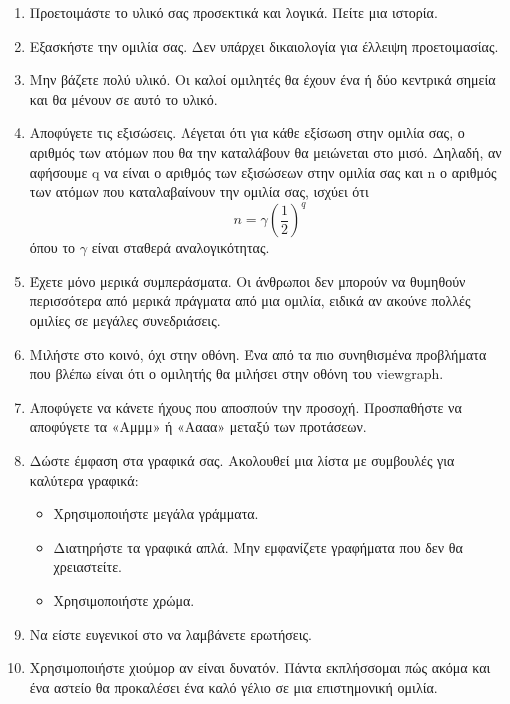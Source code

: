 \documentclass[12pt]{article}
\begin{document}
\begin{enumerate}

\item Προετοιμάστε το υλικό σας προσεκτικά και λογικά. Πείτε μια ιστορία.

\item Εξασκήστε την ομιλία σας. Δεν υπάρχει δικαιολογία για έλλειψη προετοιμασίας.

\item Μην βάζετε πολύ υλικό. Οι καλοί ομιλητές θα έχουν ένα ή δύο κεντρικά σημεία και θα μένουν σε αυτό το υλικό.

\item Αποφύγετε τις εξισώσεις. Λέγεται ότι για κάθε εξίσωση στην ομιλία σας, ο αριθμός των ατόμων που θα την καταλάβουν θα μειώνεται στο μισό. Δηλαδή, αν αφήσουμε q να είναι ο αριθμός των εξισώσεων στην ομιλία σας και n ο αριθμός των ατόμων που καταλαβαίνουν την ομιλία σας, ισχύει ότι
\begin{equation}
n = \gamma \left( \frac{1}{2} \right)^q
\end{equation}
όπου το $\gamma$ είναι σταθερά αναλογικότητας.

\item Έχετε μόνο μερικά συμπεράσματα. Οι άνθρωποι δεν μπορούν να θυμηθούν περισσότερα από μερικά πράγματα από μια ομιλία, ειδικά αν ακούνε πολλές ομιλίες σε μεγάλες συνεδριάσεις.

\item Μιλήστε στο κοινό, όχι στην οθόνη. Ένα από τα πιο συνηθισμένα προβλήματα που βλέπω είναι ότι ο ομιλητής θα μιλήσει στην οθόνη του \textlatin{viewgraph}.

\item Αποφύγετε να κάνετε ήχους που αποσπούν την προσοχή. Προσπαθήστε να αποφύγετε τα «Αμμμ» ή «Αααα» μεταξύ των προτάσεων.

\item Δώστε έμφαση στα γραφικά σας. Ακολουθεί μια λίστα με συμβουλές για καλύτερα γραφικά:

\begin{itemize}
\item Χρησιμοποιήστε μεγάλα γράμματα.

\item Διατηρήστε τα γραφικά απλά. Μην εμφανίζετε γραφήματα που δεν θα χρειαστείτε.

\item Χρησιμοποιήστε χρώμα.

\end{itemize}

\item Να είστε ευγενικοί στο να λαμβάνετε ερωτήσεις.

\item Χρησιμοποιήστε χιούμορ αν είναι δυνατόν. Πάντα εκπλήσσομαι πώς ακόμα και ένα  αστείο θα προκαλέσει ένα καλό γέλιο σε μια επιστημονική ομιλία.

\end{enumerate}
\end{document}
